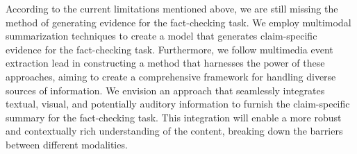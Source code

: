 According to the current limitations mentioned above, we are still missing the method of generating evidence for the fact-checking task. We employ multimodal summarization techniques to create a model that generates claim-specific evidence for the fact-checking task. Furthermore, we follow multimedia event extraction lead in constructing a method that harnesses the power of these approaches, aiming to create a comprehensive framework for handling diverse sources of information. We envision an approach that seamlessly integrates textual, visual, and potentially auditory information to furnish the claim-specific summary for the fact-checking task. This integration will enable a more robust and contextually rich understanding of the content, breaking down the barriers between different modalities.